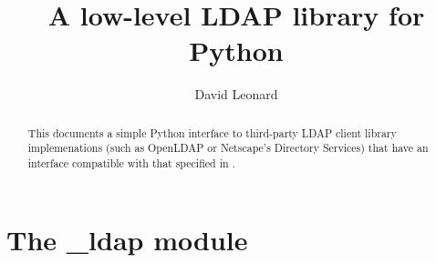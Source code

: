 \documentclass{manual}
\title{A low-level LDAP library for Python}
\author{David Leonard}
\begin{document}
\maketitle

\begin{abstract}
\noindent
This documents a simple Python interface to third-party 
LDAP client library implemenations (such as OpenLDAP or 
Netscape's Directory Services) that have an interface compatible
with that specified in .
\end{abstract}

\tableofcontents

\chapter{The \_ldap module}



\renewcommand{\indexname}{Index}
\end{document}
